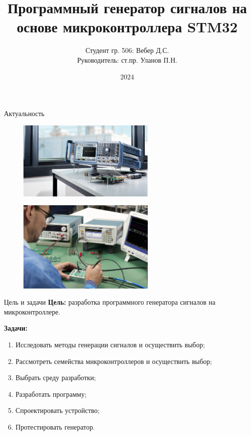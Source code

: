 \documentclass[10pt]{beamer}
\begin{document}
\title{Программный генератор сигналов на основе микроконтроллера STM32}
\author{Студент гр. 506: Вебер Д.С.\\Руководитель:  ст.пр. Уланов П.Н.}
\date{2024}


\frame{\titlepage}

\begin{frame}{Актуальность}
  \begin{figure}
  \includegraphics[width=0.6\textwidth]{actual1}
  \end{figure}
  
  \begin{figure}
  \includegraphics[width=0.6\textwidth]{actual2}
  \end{figure}
\end{frame}

\begin{frame}{Цель и задачи}
  \textbf{Цель:} разработка программного генератора сигналов на микроконтроллере.

  \textbf{Задачи:} 
	\begin{enumerate}
		\item Исследовать методы генерации сигналов и осуществить выбор;
		\item Рассмотреть семейства микроконтроллеров и осуществить выбор;
		\item Выбрать среду разработки;
		\item Разработать программу;
		\item Спроектировать устройство;
		\item Протестировать генератор.
	\end{enumerate}
\end{frame}
\end{document}
